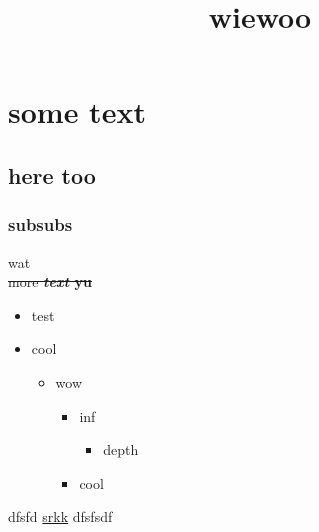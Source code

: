 \documentclass[a4paper,12pt]{article}
\begin{document}
\title{wiewoo}
\maketitle
\newpage
\section{some text}
\subsection{here too}
\subsubsection{subsubs}
wat
 \\ 
\sout{more \textbf{\textit{text} yu}}
 \\ 
\begin{itemize}
\item test
\item cool
\begin{itemize}
\item wow
\begin{itemize}
\item inf
\begin{itemize}
\item depth
\end{itemize}
\item cool
\end{itemize}
\end{itemize}
\end{itemize}
dfsfd \href{https://beaversinfos.weebly.com/}{srkk} dfsfsdf
 \\ 
\end{document}
